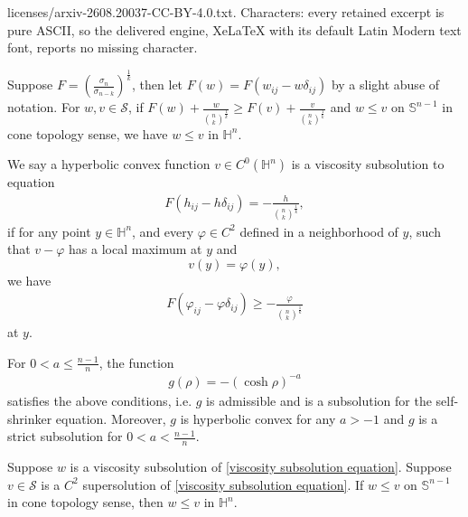 \documentclass[10pt,a4paper]{amsart}
\begin{document}
licenses/arxiv-2608.20037-CC-BY-4.0.txt. Characters: every retained excerpt is pure ASCII, so the delivered engine, XeLaTeX with its default Latin Modern text font, reports no missing character.
\begin{lemma}\label{Comparison principle}
    Suppose $F=\left( \frac{\sigma_n}{\sigma_{n-k}} \right)^{\frac{1}{k}}$, then let $F(w)=F(w_{ij}-w\delta_{ij})$ by a slight abuse of notation. For $w,v \in \mathcal{S}$, if $F(w) + \frac{w}{\binom{n}{k}^{\frac{1}{k}}} \geqslant F(v) + \frac{v}{\binom{n}{k}^{\frac{1}{k}}}$ and $w \leqslant v$ on $\mathbb{S}^{n-1}$ in cone topology sense, we have $w \leqslant v$ in $\mathbb{H}^{n}$. 
\end{lemma}

\begin{definition}
    We say a hyperbolic convex function $v \in C^0(\mathbb{H}^n)$ is a viscosity subsolution to equation
    \begin{align}
        F(h_{ij}-h\delta_{ij}) = -\frac{h}{\binom{n}{k}^{\frac{1}{k}}}, \label{viscosity subsolution equation}
    \end{align}
    if for any point $y \in \mathbb{H}^n$, and every $\varphi \in C^2$ defined in a neighborhood of $y$, such that $v-\varphi$ has a local maximum at $y$ and
    \[
    v(y) = \varphi(y),
    \]
    we have
    \begin{align*}
        F(\varphi_{ij}-\varphi\delta_{ij}) \geqslant -\frac{\varphi}{\binom{n}{k}^{\frac{1}{k}}}
    \end{align*}
    at $y$.
\end{definition}

\begin{lemma}\label{smooth function g}
    For $0 < a \leqslant \frac{n-1}{n}$, the function 
    \begin{align}\label{g=}
        g(\rho) = - \left( \cosh \rho \right)^{-a}
    \end{align}
    satisfies the above conditions, i.e. $g$ is admissible and is a subsolution for the self-shrinker equation. Moreover, $g$ is hyperbolic convex for any $a>-1$ and $g$ is a strict subsolution for $0 < a < \frac{n-1}{n}$.
\end{lemma}

\begin{lemma}\label{Viscosity comparison principle}
    Suppose $w$ is a viscosity subsolution of \eqref{viscosity subsolution equation}.
    Suppose $v \in \mathcal{S}$ is a $C^2$ supersolution of \eqref{viscosity subsolution equation}.
    If $w \leqslant v$ on $\mathbb{S}^{n-1}$ in cone topology sense, then $w \leqslant v$ in $\mathbb{H}^{n}$.
\end{lemma}
\end{document}
